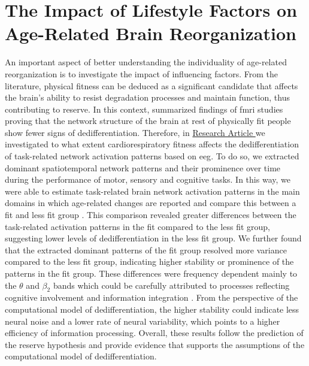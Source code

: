 \section{The Impact of Lifestyle Factors on Age-Related Brain Reorganization}
An important aspect of better understanding the individuality of age-related reorganization is to investigate the impact of influencing factors. From the literature, physical fitness can be deduced as a significant candidate that affects the brain's ability to resist degradation processes and maintain function, thus contributing to reserve. In this context, \citeauthor{Stillman2019} \cite{Stillman2019} summarized findings of \gls{fmri} studies proving that the network structure of the brain at rest of physically fit people show fewer signs of dedifferentiation. Therefore, in \hyperref[results:paperIII]{Research Article } we investigated to what extent cardiorespiratory fitness affects the dedifferentiation of task-related network activation patterns based on \gls{eeg}. To do so, we extracted dominant spatiotemporal network patterns and their prominence over time during the performance of motor, sensory and cognitive tasks. In this way, we were able to estimate task-related brain network activation patterns in the main domains in which age-related changes are reported and compare this between a fit and less fit group \cite{Baltes1997, Sala-Llonch2015, Park2009}. This comparison revealed greater differences between the task-related activation patterns in the fit compared to the less fit group, suggesting lower levels of dedifferentiation in the less fit group. We further found that the extracted dominant patterns of the fit group resolved more variance compared to the less fit group, indicating higher stability or prominence of the patterns in the fit group. These differences were frequency dependent mainly to the $\theta$ and $\beta_2$ bands which could be carefully attributed to processes reflecting cognitive involvement and information integration \cite{Siegel2012}. From the perspective of the computational model of dedifferentiation, the higher stability could indicate less neural noise and a lower rate of neural variability, which points to a higher efficiency of information processing. Overall, these results follow the prediction of the reserve hypothesis and provide evidence that supports the assumptions of the computational model of dedifferentiation.\\
